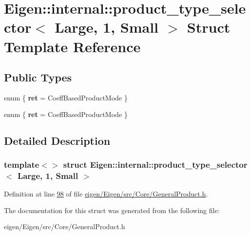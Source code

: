 \hypertarget{struct_eigen_1_1internal_1_1product__type__selector_3_01_large_00_011_00_01_small_01_4}{}\section{Eigen\+:\+:internal\+:\+:product\+\_\+type\+\_\+selector$<$ Large, 1, Small $>$ Struct Template Reference}
\label{struct_eigen_1_1internal_1_1product__type__selector_3_01_large_00_011_00_01_small_01_4}
\subsection*{Public Types}
\begin{DoxyCompactItemize}
\item 
\mbox{\label{struct_eigen_1_1internal_1_1product__type__selector_3_01_large_00_011_00_01_small_01_4_aaee245176993ff0e3cd879c632990452}} 
enum \{ {\bfseries ret} = Coeff\+Based\+Product\+Mode
 \}
\item 
\mbox{\label{struct_eigen_1_1internal_1_1product__type__selector_3_01_large_00_011_00_01_small_01_4_a2fcff55ae7b1c062699ecafd5fa3f279}} 
enum \{ {\bfseries ret} = Coeff\+Based\+Product\+Mode
 \}
\end{DoxyCompactItemize}


\subsection{Detailed Description}
\subsubsection*{template$<$$>$\newline
struct Eigen\+::internal\+::product\+\_\+type\+\_\+selector$<$ Large, 1, Small $>$}



Definition at line \hyperlink{eigen_2_eigen_2src_2_core_2_general_product_8h_source_l00098}{98} of file \hyperlink{eigen_2_eigen_2src_2_core_2_general_product_8h_source}{eigen/\+Eigen/src/\+Core/\+General\+Product.\+h}.



The documentation for this struct was generated from the following file\+:\begin{DoxyCompactItemize}
\item 
eigen/\+Eigen/src/\+Core/\+General\+Product.\+h\end{DoxyCompactItemize}
